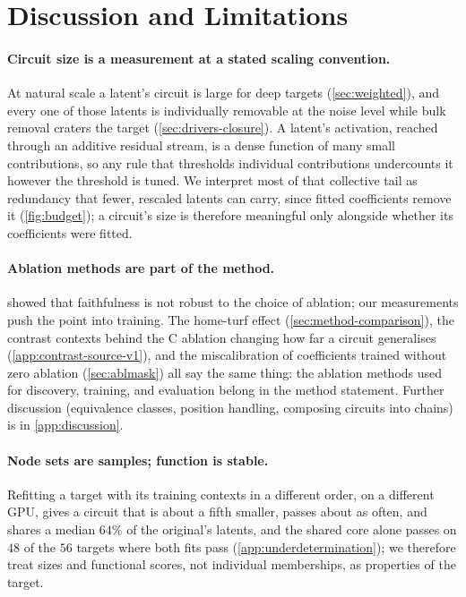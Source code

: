 \documentclass[10pt]{article}
\begin{document}
\section{Discussion and Limitations}
\label{sec:discussion}

\paragraph{Circuit size is a measurement at a stated scaling convention.}
At natural scale a latent's circuit is large for deep targets (\cref{sec:weighted}), and every one of those latents is individually removable at the noise level while bulk removal craters the target (\cref{sec:drivers-closure}).
A latent's activation, reached through an additive residual stream, is a dense function of many small contributions, so any rule that thresholds individual contributions undercounts it however the threshold is tuned.
We interpret most of that collective tail as redundancy that fewer, rescaled latents can carry, since fitted coefficients remove it (\cref{fig:budget}); a circuit's size is therefore meaningful only alongside whether its coefficients were fitted.

\paragraph{Ablation methods are part of the method.}
\citet{miller2024transformer} showed that faithfulness is not robust to the choice of ablation; our measurements push the point into training.
The home-turf effect (\cref{sec:method-comparison}), the contrast contexts behind the C ablation changing how far a circuit generalises (\cref{app:contrast-source-v1}), and the miscalibration of coefficients trained without zero ablation (\cref{sec:ablmask}) all say the same thing: the ablation methods used for discovery, training, and evaluation belong in the method statement.
Further discussion (equivalence classes, position handling, composing circuits into chains) is in \cref{app:discussion}.

\paragraph{Node sets are samples; function is stable.}
Refitting a target with its training contexts in a different order, on a different GPU, gives a circuit that is about a fifth smaller, passes about as often, and shares a median $64\%$ of the original's latents, and the shared core alone passes on $48$ of the $56$ targets where both fits pass (\cref{app:underdetermination}); we therefore treat sizes and functional scores, not individual memberships, as properties of the target.
\end{document}
